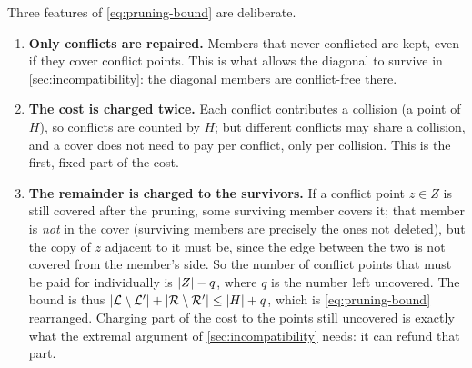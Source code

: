 
\begin{ideabox}[title={Why this is the right statement}]
Three features of \eqref{eq:pruning-bound} are deliberate.
\begin{enumerate}[leftmargin=1.3em,itemsep=2pt,topsep=1pt]
\item \textbf{Only conflicts are repaired.} Members that never conflicted are kept, even if they
  cover conflict points. This is what allows the diagonal to survive in
  \cref{sec:incompatibility}: the diagonal members are conflict-free there.
\item \textbf{The cost is charged twice.} Each conflict contributes a collision (a point of $H$),
  so conflicts are counted by $H$; but different conflicts may share a collision, and a cover does
  not need to pay per conflict, only per collision. This is the first, fixed part of the cost.
\item \textbf{The remainder is charged to the survivors.} If a conflict point $z\in Z$ is still
  covered after the pruning, some surviving member covers it; that member is \emph{not} in the cover
  (surviving members are precisely the ones not deleted), but the copy of $z$ adjacent to it must be,
  since the edge between the two is not covered from the member's side. So the number of conflict
  points that must be paid for individually is
  $\lvert Z\rvert-q$, where $q$ is the number left uncovered. The bound is thus
  $\lvert \mathcal L\setminus\mathcal L'\rvert+\lvert \mathcal R\setminus\mathcal R'\rvert\le\lvert H\rvert+q$, which is
  \eqref{eq:pruning-bound} rearranged. Charging part of the cost to the points still uncovered is
  exactly what the extremal argument of \cref{sec:incompatibility} needs: it can refund that part.
\end{enumerate}
\end{ideabox}




